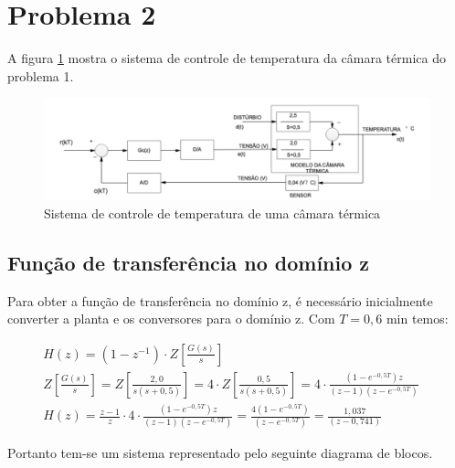 \documentclass[a4paper,12pt]{article}
\begin{document}
	\section{Problema 2}
		A figura \ref{fig:plantaproblema2} mostra o sistema de controle de temperatura da câmara térmica do problema 1.
		
		\begin{figure}[H]
			\centering
			\includegraphics[width=0.9\linewidth]{images/planta_problema2.png}
			\caption{Sistema de controle de temperatura de uma câmara térmica}
			\label{fig:plantaproblema2}
		\end{figure}
	
		\subsection{Função de transferência no domínio z}
			Para obter a função de transferência no domínio z, é necessário inicialmente converter a planta e os conversores para o domínio z. Com $T=0,6$ min temos:
		
			\begin{equation}
				\left.
				\begin{array}{c}
					\displaystyle H(z) = (1 - z^{-1}) \cdot Z\left[\frac{G(s)}{s}\right] \\[20pt]
					
					\displaystyle Z\left[\frac{G(s)}{s}\right] = Z\left[\frac{2,0}{s(s+0,5)}\right] = 4 \cdot Z\left[\frac{0,5}{s(s+0,5)}\right] = 4 \cdot \frac{(1 - e^{-0,5T})z}{(z-1)(z-e^{-0,5T})} \\[20pt]
					\displaystyle H(z) = \frac{z-1}{z} \cdot 4 \cdot \frac{(1 - e^{-0,5T})z}{(z-1)(z-e^{-0,5T})} = \frac{4(1 - e^{-0,5T})}{(z-e^{-0,5T})} = \frac{1,037}{(z-0,741)}
				\end{array}
				\right.
				\quad 
				\label{eq:hz06}
			\end{equation}
			
			Portanto tem-se um sistema representado pelo seguinte diagrama de blocos.
\end{document}
